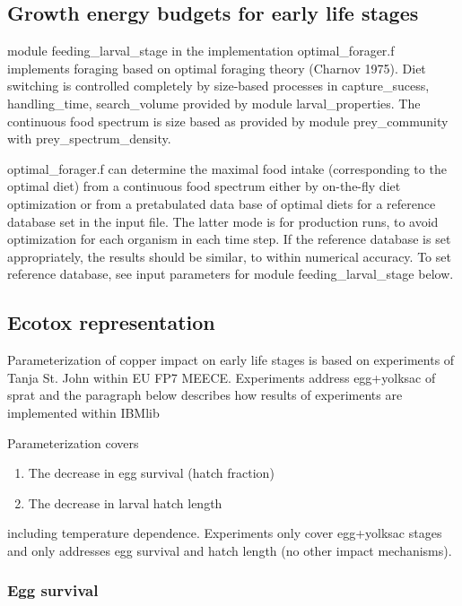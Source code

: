 \subsection{Growth energy budgets for early life stages} 

module feeding\_larval\_stage  in the implementation  optimal\_forager.f implements 
foraging based on optimal foraging theory (Charnov 1975). Diet switching is controlled completely by 
size-based processes in capture\_sucess, handling\_time, search\_volume provided by module larval\_properties. 
The continuous food spectrum is size based as provided by module prey\_community with prey\_spectrum\_density.
  
optimal\_forager.f can determine the maximal food intake (corresponding to the optimal diet) from a continuous food spectrum 
either by on-the-fly diet optimization or from a pretabulated data base of optimal diets for a reference database
set in the input file. The latter mode is for production runs, to avoid optimization for each organism in each 
time step. If the reference database is set appropriately, the results should be similar, to within numerical accuracy.
To set reference database, see input parameters for module feeding\_larval\_stage below.

\subsection{Ecotox representation} 

Parameterization of copper impact on early life stages is based on experiments of Tanja St. John 
 within EU FP7 MEECE. Experiments address egg+yolksac of sprat and the paragraph below describes
how results of experiments are implemented within IBMlib

Parameterization covers
\begin{enumerate}
   \item The decrease in egg survival (hatch fraction)
   \item The decrease in larval hatch length
\end{enumerate}
including temperature dependence. Experiments only cover egg+yolksac stages
and only addresses egg survival and hatch length (no other impact mechanisms).
\subsubsection{Egg survival} 

